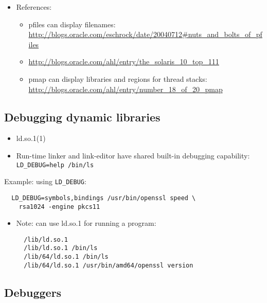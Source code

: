 \begin{itemize}
\item References:
  \begin{itemize}
  \item pfiles can display filenames:
  \url{http://blogs.oracle.com/eschrock/date/20040712#nuts\_and\_bolts\_of\_pfiles}
  \item \url{http://blogs.oracle.com/ahl/entry/the\_solaris\_10\_top\_111}
  \item pmap can display libraries and regions for thread stacks:
  \url{http://blogs.oracle.com/ahl/entry/number\_18\_of\_20\_pmap}
  \end{itemize}
\end{itemize}

\subsection{Debugging dynamic libraries}

\begin{itemize}
  \item ld.so.1(1)
  \item Run-time linker and link-editor have shared built-in debugging
  capability: \\
  \texttt{LD\_DEBUG=help /bin/ls}
\end{itemize}

Example: using \texttt{LD\_DEBUG}: \\
\begin{verbatim}
  LD_DEBUG=symbols,bindings /usr/bin/openssl speed \
    rsa1024 -engine pkcs11
\end{verbatim}

\begin{itemize}
  \item Note: can use ld.so.1 for running a program:
\begin{verbatim}
  /lib/ld.so.1
  /lib/ld.so.1 /bin/ls
  /lib/64/ld.so.1 /bin/ls
  /lib/64/ld.so.1 /usr/bin/amd64/openssl version
\end{verbatim}
\end{itemize}

\subsection{Debuggers}

